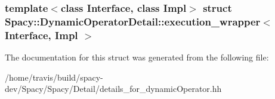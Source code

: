 \subsubsection*{template$<$class Interface, class Impl$>$ struct Spacy\-::\-Dynamic\-Operator\-Detail\-::execution\-\_\-wrapper$<$ Interface, Impl $>$}



\-The documentation for this struct was generated from the following file\-:\begin{DoxyCompactItemize}
\item 
/home/travis/build/spacy-\/dev/\-Spacy/\-Spacy/\-Detail/details\-\_\-for\-\_\-dynamic\-Operator.\-hh\end{DoxyCompactItemize}
